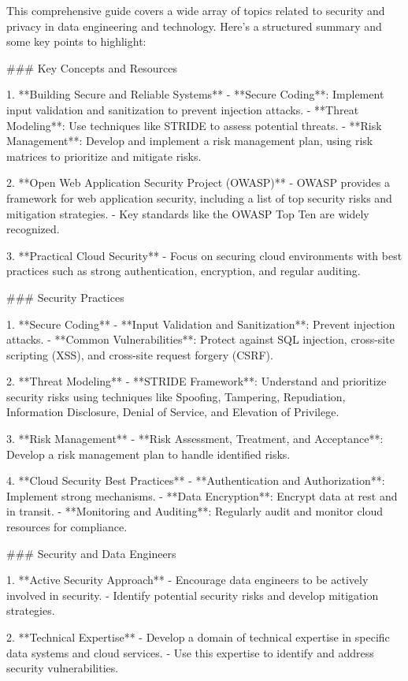 This comprehensive guide covers a wide array of topics related to security and privacy in data engineering and technology. Here’s a structured summary and some key points to highlight:

### Key Concepts and Resources

1. **Building Secure and Reliable Systems**
   - **Secure Coding**: Implement input validation and sanitization to prevent injection attacks.
   - **Threat Modeling**: Use techniques like STRIDE to assess potential threats.
   - **Risk Management**: Develop and implement a risk management plan, using risk matrices to prioritize and mitigate risks.

2. **Open Web Application Security Project (OWASP)**
   - OWASP provides a framework for web application security, including a list of top security risks and mitigation strategies.
   - Key standards like the OWASP Top Ten are widely recognized.

3. **Practical Cloud Security**
   - Focus on securing cloud environments with best practices such as strong authentication, encryption, and regular auditing.

### Security Practices

1. **Secure Coding**
   - **Input Validation and Sanitization**: Prevent injection attacks.
   - **Common Vulnerabilities**: Protect against SQL injection, cross-site scripting (XSS), and cross-site request forgery (CSRF).

2. **Threat Modeling**
   - **STRIDE Framework**: Understand and prioritize security risks using techniques like Spoofing, Tampering, Repudiation, Information Disclosure, Denial of Service, and Elevation of Privilege.

3. **Risk Management**
   - **Risk Assessment, Treatment, and Acceptance**: Develop a risk management plan to handle identified risks.

4. **Cloud Security Best Practices**
   - **Authentication and Authorization**: Implement strong mechanisms.
   - **Data Encryption**: Encrypt data at rest and in transit.
   - **Monitoring and Auditing**: Regularly audit and monitor cloud resources for compliance.

### Security and Data Engineers

1. **Active Security Approach**
   - Encourage data engineers to be actively involved in security.
   - Identify potential security risks and develop mitigation strategies.

2. **Technical Expertise**
   - Develop a domain of technical expertise in specific data systems and cloud services.
   - Use this expertise to identify and address security vulnerabilities.

